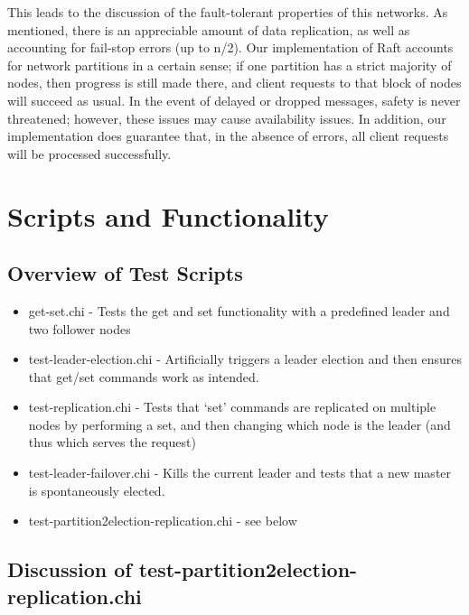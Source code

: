 \documentclass{article}
\begin{document}
This leads to the discussion of the fault-tolerant properties of this networks. As mentioned, there is an appreciable amount of data replication, as well as accounting for fail-stop errors (up to n/2). Our implementation of Raft accounts for network partitions in a certain sense; if one partition has a strict majority of nodes, then progress is still made there, and client requests to that block of nodes will succeed as usual. In the event of delayed or dropped messages, safety is never threatened; however, these issues may cause availability issues. In addition, our implementation does guarantee that, in the absence of errors, all client requests will be processed successfully.

\newpage

\section{Scripts and Functionality}

\subsection{Overview of Test Scripts}
\begin{itemize}
\item get-set.chi - Tests the get and set functionality with a predefined leader and two follower nodes
\item test-leader-election.chi - Artificially triggers a leader election and then ensures that get/set commands work as intended.
\item test-replication.chi - Tests that ‘set’ commands are replicated on multiple nodes by performing a set, and then changing which node is the leader (and thus which serves the request)
\item test-leader-failover.chi - Kills the current leader and tests that a new master is spontaneously elected.
\item test-partition2election-replication.chi - see below
\end{itemize}

\subsection{Discussion of test-partition2election-replication.chi}
\end{document}
